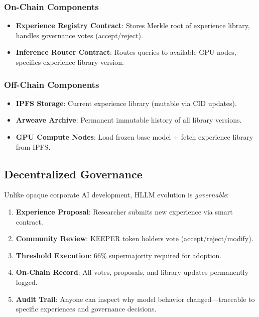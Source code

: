 \documentclass[twocolumn,11pt]{article}
\begin{document}
\subsubsection{On-Chain Components}
\begin{itemize}
    \item \textbf{Experience Registry Contract}: Stores Merkle root of experience library, handles governance votes (accept/reject).
    \item \textbf{Inference Router Contract}: Routes queries to available GPU nodes, specifies experience library version.
\end{itemize}

\subsubsection{Off-Chain Components}
\begin{itemize}
    \item \textbf{IPFS Storage}: Current experience library (mutable via CID updates).
    \item \textbf{Arweave Archive}: Permanent immutable history of all library versions.
    \item \textbf{GPU Compute Nodes}: Load frozen base model + fetch experience library from IPFS.
\end{itemize}

\subsection{Decentralized Governance}

Unlike opaque corporate AI development, HLLM evolution is \textit{governable}:

\begin{enumerate}
    \item \textbf{Experience Proposal}: Researcher submits new experience via smart contract.
    \item \textbf{Community Review}: KEEPER token holders vote (accept/reject/modify).
    \item \textbf{Threshold Execution}: 66\% supermajority required for adoption.
    \item \textbf{On-Chain Record}: All votes, proposals, and library updates permanently logged.
    \item \textbf{Audit Trail}: Anyone can inspect why model behavior changed—traceable to specific experiences and governance decisions.
\end{enumerate}
\end{document}
